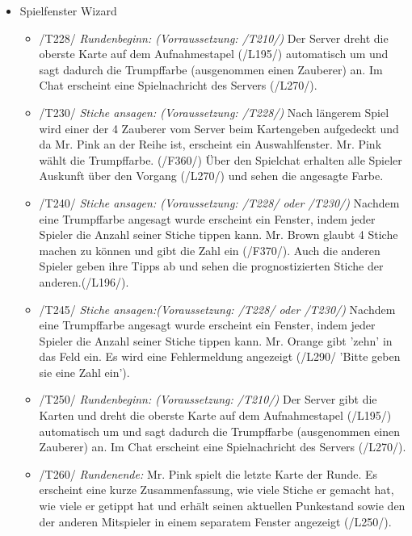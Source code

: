 \documentclass{article}
\begin{document}
\begin{itemize}
	\item Spielfenster Wizard
	
	\begin{itemize}
	
		\item /T228/ \textit{Rundenbeginn: (Vorraussetzung: /T210/)} Der \gls{Server} dreht die oberste Karte auf dem Aufnahmestapel (/L195/) automatisch um und sagt dadurch die Trumpffarbe (ausgenommen einen Zauberer) an. Im Chat erscheint eine Spielnachricht des \gls{Server}s (/L270/).

		\item /T230/ \textit{Stiche ansagen: (Voraussetzung: /T228/)} Nach längerem Spiel wird einer der 4 Zauberer vom \gls{Server} beim Kartengeben aufgedeckt und da Mr. Pink an der Reihe ist, erscheint ein Auswahlfenster. Mr. Pink wählt die Trumpffarbe. (/F360/) Über den Spielchat erhalten alle Spieler Auskunft über den Vorgang (/L270/) und sehen die angesagte Farbe.
	
		\item /T240/ \textit{Stiche ansagen: (Voraussetzung: /T228/ oder /T230/)} Nachdem eine Trumpffarbe angesagt wurde erscheint ein Fenster, indem jeder Spieler die Anzahl seiner Stiche tippen kann. Mr. Brown glaubt 4 Stiche machen zu können und gibt die Zahl ein (/F370/). Auch die anderen Spieler geben ihre Tipps ab und sehen die prognostizierten Stiche der anderen.(/L196/).
		
		\item /T245/ \textit{Stiche ansagen:(Voraussetzung: /T228/ oder /T230/)} Nachdem eine Trumpffarbe angesagt wurde erscheint ein Fenster, indem jeder Spieler die Anzahl seiner Stiche tippen kann. Mr. Orange gibt 'zehn' in das Feld ein. Es wird eine Fehlermeldung angezeigt (/L290/ 'Bitte geben sie eine Zahl ein').

		\item /T250/ \textit{Rundenbeginn: (Voraussetzung: /T210/)} Der Server gibt die Karten und dreht die oberste Karte auf dem Aufnahmestapel (/L195/) automatisch um und sagt dadurch die Trumpffarbe (ausgenommen einen Zauberer) an. Im Chat erscheint eine Spielnachricht des \gls{Server}s (/L270/).
		
				\item /T260/ \textit{Rundenende:} Mr. Pink spielt die letzte Karte der Runde. Es erscheint eine kurze Zusammenfassung, wie viele Stiche er gemacht hat, wie viele er getippt hat und erhält seinen aktuellen Punkestand sowie den der anderen Mitspieler in einem separatem Fenster angezeigt (/L250/).
					

\end{itemize}
\end{itemize}
\end{document}
